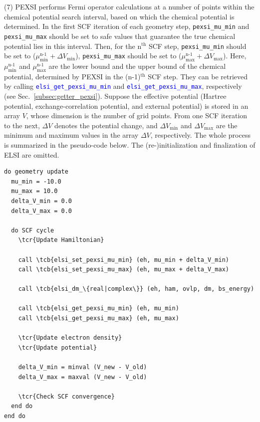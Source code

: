 \documentclass{report}
\newcommand{\tcb}[1]{\textcolor{blue}{#1}}
\newcommand{\tcr}[1]{\textcolor{red}{#1}}
\newcommand{\api}[1]{\textcolor{blue}{\texttt{#1}}}
\begin{document}
(7) PEXSI performs Fermi operator calculations at a number of points within the chemical potential search interval, based on which the chemical potential is determined. In the first SCF iteration of each geometry step, \texttt{pexsi\_mu\_min} and \texttt{pexsi\_mu\_max} should be set to safe values that guarantee the true chemical potential lies in this interval. Then, for the n$^\text{th}$ SCF step, \texttt{pexsi\_mu\_min} should be set to ($\mu_\text{min}^\text{n-1} + \Delta V_\text{min}$), \texttt{pexsi\_mu\_max} should be set to ($\mu_\text{max}^\text{n-1} + \Delta V_\text{max}$). Here, $\mu_\text{min}^\text{n-1}$ and $\mu_\text{max}^\text{n-1}$ are the lower bound and the upper bound of the chemical potential, determined by PEXSI in the (n-1)$^\text{th}$ SCF step. They can be retrieved by calling \api{elsi\_get\_pexsi\_mu\_min} and \api{elsi\_get\_pexsi\_mu\_max}, respectively (see Sec.~\ref{subsec:getter_pexsi}). Suppose the effective potential (Hartree potential, exchange-correlation potential, and external potential) is stored in an array $V$, whose dimension is the number of grid points. From one SCF iteration to the next, $\Delta V$ denotes the potential change, and $\Delta V_\text{min}$ and $\Delta V_\text{max}$ are the minimum and maximum values in the array $\Delta V$, respectively. The whole process is summarized in the pseudo-code below. The (re-)initialization and finalization of ELSI are omitted.

\begin{tcolorbox}
\begin{Verbatim}[commandchars=\\\{\}]
do geometry update
  mu_min = -10.0
  mu_max = 10.0
  delta_V_min = 0.0
  delta_V_max = 0.0

  do SCF cycle
    \tcr{Update Hamiltonian}

    call \tcb{elsi_set_pexsi_mu_min} (eh, mu_min + delta_V_min)
    call \tcb{elsi_set_pexsi_mu_max} (eh, mu_max + delta_V_max)

    call \tcb{elsi_dm_\{real|complex\}} (eh, ham, ovlp, dm, bs_energy)

    call \tcb{elsi_get_pexsi_mu_min} (eh, mu_min)
    call \tcb{elsi_get_pexsi_mu_max} (eh, mu_max)

    \tcr{Update electron density}
    \tcr{Update potential}

    delta_V_min = minval (V_new - V_old)
    delta_V_max = maxval (V_new - V_old)

    \tcr{Check SCF convergence}
  end do
end do
\end{Verbatim}
\end{tcolorbox}
\end{document}
